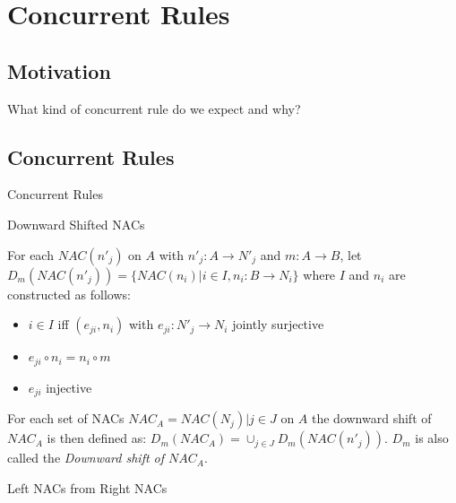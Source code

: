\chapter{Concurrent Rules}

\section{Motivation}

What kind of concurrent rule do we expect and why?

\section{Concurrent Rules}

\begin{definition}{Concurrent Rules}
\end{definition}

\begin{definition}{Downward Shifted NACs}


For each $NAC(n'_j)$ on $A$ with $n'_j : A \rightarrow N'_j$ and $m : A \rightarrow B$, 
let $D_m(NAC(n'_j)) = \{ NAC(n_i)|i \in I, n_i : B \rightarrow N_i \}$ where $I$ and $n_i$ 
are constructed as follows:
\begin{itemize}
  \item $i \in I$ iff $(e_{ji}, n_i)$ with $e_{ji} : N'_j \rightarrow N_i$ jointly surjective 
  \item $e_{ji} \circ n_i = n_i \circ m$
  \item $e_{ji}$ injective
\end{itemize}

For each set of NACs $NAC_A = {NAC(N_j)| j \in J}$ on $A$ the downward shift of $NAC_A$ is then defined as: $D_m(NAC_A) = \cup_{j \in J}D_m(NAC(n'_j))$. $D_m$ is also called the \emph{Downward shift of $NAC_A$}.

\end{definition}

\begin{definition}{Left NACs from Right NACs}

\centerline{}

\end{definition}

